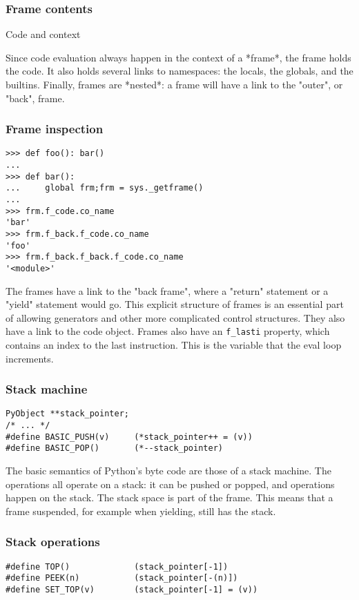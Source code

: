 \begin{frame}
\frametitle{Frame contents}

Code and context
\end{frame}

Since code evaluation always happen in the context of a
*frame*,
the frame holds the code.
It also holds several links to namespaces:
the locals, the globals, and the builtins.
Finally,
frames are
*nested*:
a frame will have a link to the "outer",
or "back",
frame.



\begin{frame}
\frametitle{Frame inspection}

\begin{lstlisting}
>>> def foo(): bar()
... 
>>> def bar():
...     global frm;frm = sys._getframe()
... 
>>> frm.f_code.co_name
'bar'
>>> frm.f_back.f_code.co_name
'foo'
>>> frm.f_back.f_back.f_code.co_name
'<module>'
\end{lstlisting}
\end{frame}

The frames have a link to the "back frame",
where a "return" statement or a "yield" statement would go.
This explicit structure of frames is an essential part of allowing
generators and other more complicated control structures.
They also have a link to the code object.
Frames also have an \verb|f_lasti| property,
which contains an index to the last instruction.
This is the variable that the eval loop increments.

\begin{frame}
\frametitle{Stack machine}

\begin{lstlisting}
PyObject **stack_pointer;
/* ... */
#define BASIC_PUSH(v)     (*stack_pointer++ = (v))
#define BASIC_POP()       (*--stack_pointer)
\end{lstlisting}
\end{frame}

The basic semantics of Python's byte code are those of a stack machine.
The operations all operate on a stack:
it can be pushed or popped,
and operations happen on the stack.
The stack space is part of the frame.
This means that a frame suspended,
for example when yielding,
still has the stack.

\begin{frame}
\frametitle{Stack operations}

\begin{lstlisting}
#define TOP()             (stack_pointer[-1])
#define PEEK(n)           (stack_pointer[-(n)])
#define SET_TOP(v)        (stack_pointer[-1] = (v))
\end{lstlisting}
\end{frame}

